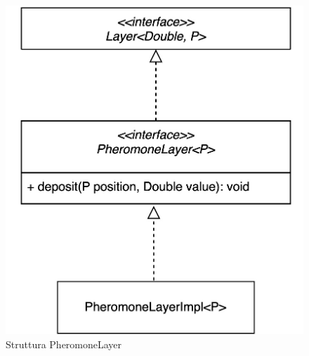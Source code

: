 \documentclass[12pt,a4paper,openright,twoside]{book}
\begin{document}
\begin{figure}[h!]
    \centering
    \includegraphics[width=.8\linewidth]{figures/pheromoneLayer.jpeg}
    \caption{Struttura PheromoneLayer}\label{fig:phLayer}
\end{figure}

\clearpage
\end{document}
